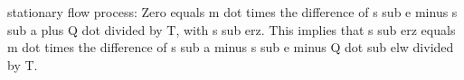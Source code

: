 stationary flow process:
Zero equals m dot times the difference of s sub e minus s sub a plus Q dot divided by T, with s sub erz.
This implies that s sub erz equals m dot times the difference of s sub a minus s sub e minus Q dot sub elw divided by T.